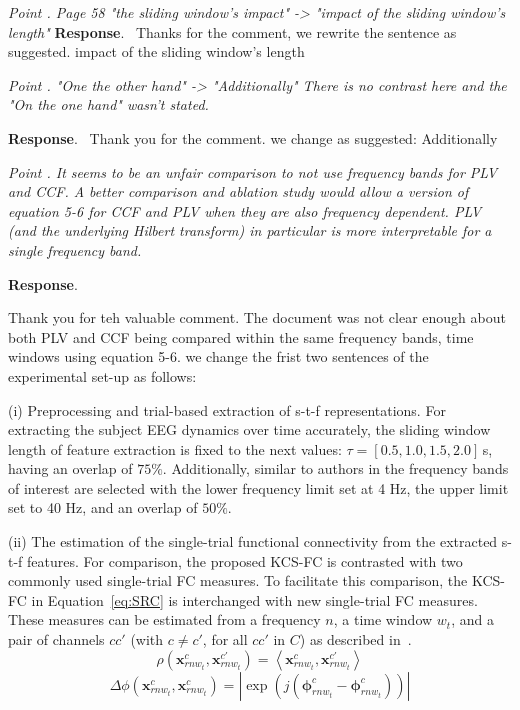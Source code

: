 \documentclass[runningheads]{llncs}
\newcommand{\ve}[1]{\bm {#1}}
\newenvironment{reviewer}{\setcounter{pointcounter}{1}}{}
\newcommand{\changes}[1]{\textcolor[rgb]{1.00,0.00,0.00}{#1}}
\newcommand{\point}[1]{\medskip \noindent
  \textsl{{\fontseries{b}\selectfont Point \thepointcounter}.
\stepcounter{pointcounter} #1}}
\newcommand{\reply}{\medskip \noindent \textbf{Response}.\ }
\begin{document}
\begin{reviewer}
  \point{Page 58 "the sliding window's impact" -> "impact of the
  sliding window's length"}
  \reply{
    Thanks for the comment, we rewrite the sentence as suggested.
    \changes{impact of the sliding window's length}
  }


  \point{
    "One the other hand" -> "Additionally" There is no contrast here
    and the "On the one hand" wasn't stated.
  }

  \reply{
    Thank you for the comment.  we change as suggested: \changes{Additionally}
  }

  \point{It seems to be an unfair comparison to not use frequency
    bands for PLV and CCF. A better comparison and ablation study would
    allow a version of equation 5-6 for CCF and PLV when they are also
    frequency dependent. PLV (and the underlying Hilbert transform) in
  particular is more interpretable for a single frequency band.}

  \reply{
    Thank you for teh valuable comment. The document was not clear
    enough about both PLV and CCF being compared within the same
    frequency bands, time windows using equation 5-6. we change the
    frist two sentences of the experimental set-up as follows:

    \changes{
      ({i}) Preprocessing and trial-based extraction of {s-t-f}
      representations. For extracting the subject EEG dynamics over
      time accurately, the sliding window length of feature
      extraction is fixed to the next values:
      $\tau=[0.5,1.0,1.5,2.0]$\,{s}, having an overlap of $75\%$.
      Additionally, similar to authors in \cite{ang2008filter} the
      frequency bands of interest are selected with the lower
      frequency limit set at 4 Hz, the upper limit set to 40 Hz, and
      an overlap of $50\%$.
    }

    \changes{
      ({ii}) The estimation of the single-trial functional
      connectivity from the extracted {s-t-f} features. For
      comparison, the proposed KCS-FC is contrasted with two commonly
      used single-trial FC measures. To facilitate this comparison,
      the KCS-FC in Equation~\eqref{eq:SRC} is interchanged with new
      single-trial FC measures. These measures can be estimated from
      a frequency $n$, a time window $w_t$, and a pair of channels
      ${cc'}$ (with $c \neq c'$, for all $cc'$ in $C$) as described
      in~\cite{rodrigue2019}.
      \begin{equation}
        \rho(\ve{x}^{c}_{rnw_t},\ve{x}^{c'}_{rnw_t})
        ={\left<\ve{x}^{c}_{rnw_t},\ve{x}^{c'}_{rnw_t}\right>}
      \end{equation}
      \begin{equation}
        {\Delta\phi(\ve{x}^{c}_{rnw_t},\ve{x}^{c}_{rnw_t})}  {=
        {|\exp(j(\ve{\phi}_{rnw_t}^{c}-\ve{\phi}_{rnw_t}^{c}))|}}
      \end{equation}
    }
  }


\end{reviewer}
\end{document}
